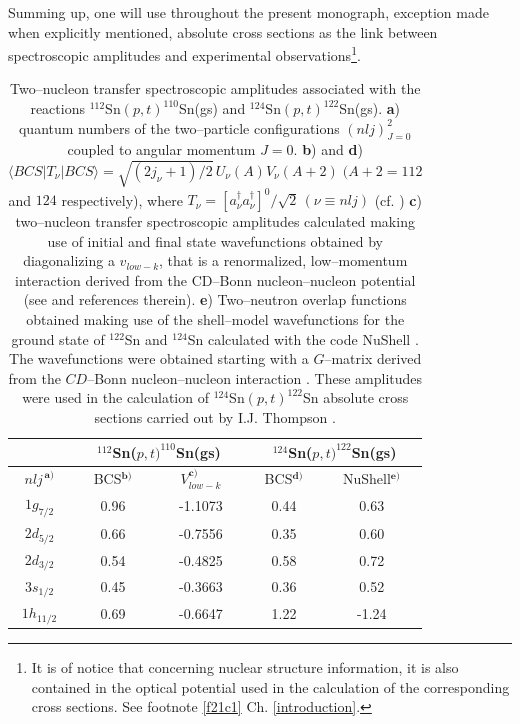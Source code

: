 Summing up, one will use throughout the present monograph, exception made when explicitly mentioned, absolute cross sections as the  link between spectroscopic amplitudes and experimental observations\footnote{It is of notice that concerning nuclear structure information, it is also contained in the optical potential used in the calculation of the corresponding cross sections. See footnote \ref{f21c1} Ch. \ref{introduction}.}.
 \begin{table}[h!]
	{\begin{tabular}{|c|c|c|c|c|}
			\cline{2-5} 
			\multicolumn{1}{c|}{ }& \multicolumn{2}{|c|}{ $^{112}$Sn($p,t)^{110}$Sn(gs)}&\multicolumn{2}{|c|}{$^{124}$Sn($p,t)^{122}$Sn(gs)} \\
			\hline
			$nlj^{\,\mathbf a)}$ & BCS$^{\mathbf b)}$ & $V_{low-k}^{\mathbf c)}$ & BCS$^{\mathbf d)}$& NuShell$^{\mathbf e)}$  \\
			\hline
			$1g_{7/2}$ & 0.96 &-1.1073 & 0.44 & 0.63  \\
			$2d_{5/2}$ & 0.66 & -0.7556& 0.35 & 0.60  \\
			$2d_{3/2}$ & 0.54 &  -0.4825& 0.58 & 0.72  \\
			$3s_{1/2}$ & 0.45 &  -0.3663&  0.36 & 0.52  \\
			$1h_{11/2}$ & 0.69 & -0.6647 & 1.22 & -1.24  \\
			\hline 
	\end{tabular}}
	\caption{Two--nucleon transfer spectroscopic amplitudes associated with the reactions $^{112}$Sn$(p,t)^{110}$Sn(gs) and $^{124}$Sn$(p,t)^{122}$Sn(gs). \textbf{a}) quantum numbers of the two--particle configurations $(nlj)^2_{J=0}$ coupled to angular momentum $J=0$. \textbf{b}) and \textbf{d}) $\langle BCS|T_\nu|BCS\rangle=\sqrt{(2j_\nu+1)/2}\,U_\nu(A) V_\nu(A+2)\;(A+2=112$ and $ 124$ respectively), where $T_\nu=[a^\dagger_{\nu}a^\dagger_\nu]^0/\sqrt{2} \,(\nu\equiv nlj)$ (cf. \cite{Potel:11,Potel:13,Potel:13b}) \textbf{c}) two--nucleon transfer spectroscopic amplitudes calculated making use of initial and final state wavefunctions obtained by diagonalizing a $v_{low-k}$, that is a renormalized, low--momentum interaction derived from the CD--Bonn nucleon--nucleon potential (see \cite{Guazzoni:06} and references therein). \textbf{e}) Two--neutron overlap functions obtained making use of the shell--model wavefunctions for the ground state of $^{122}$Sn and $^{124}$Sn calculated with the code NuShell \citep{Brown:07}. The wavefunctions were obtained starting with a $G$--matrix derived from the $CD$--Bonn nucleon--nucleon interaction \cite{Machleidt:96}. These amplitudes were used in the calculation of $^{124}$Sn$(p,t)^{122}$Sn absolute cross sections carried out by I.J. Thompson \citep{Thompson:13}.}\label{tab1D1}
\end{table}
